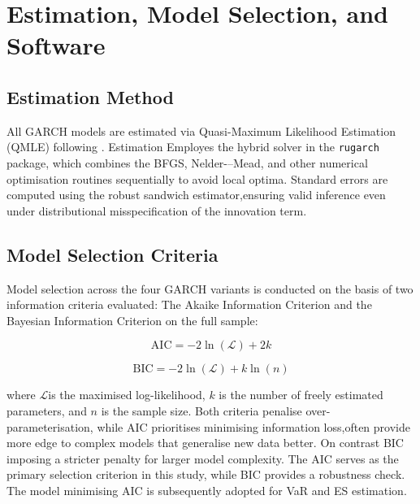 \section{Estimation, Model Selection, and Software}
\subsection{Estimation Method}

All GARCH models are estimated via Quasi-Maximum Likelihood Estimation (QMLE) following \citet{bollerslev1992quasi}. Estimation Employes the hybrid solver in the \citep{ghalanos2020introduction} \texttt{rugarch} package, which combines the BFGS,  Nelder-–Mead, and other numerical optimisation routines sequentially to avoid local optima. Standard errors are computed using the \citet{bollerslev1992quasi} robust sandwich estimator,ensuring valid inference even under distributional misspecification of the innovation term.

\subsection{Model Selection Criteria}
Model selection across the four GARCH variants is conducted on the basis of two information criteria evaluated: The Akaike Information 
Criterion \citep[AIC;][]{akaike1974} and the Bayesian 
Information Criterion \citep[BIC;][]{schwarz1978} on the full sample:

\begin{equation}
    \mathrm{AIC}
=
-2 \ln(\mathcal{L})
+
2k
\end{equation}

\begin{equation}
    \mathrm{BIC}
=
-2 \ln(\mathcal{L})
+
k \ln(n)
\end{equation}

where $\mathcal{L}$is the  maximised log-likelihood, $k$ is the number of freely estimated parameters, and $n$ is the sample size. Both criteria penalise  over-parameterisation, while AIC prioritises  minimising  information loss,often provide more edge to complex models that generalise new data better. On contrast BIC imposing a stricter penalty for larger model complexity. The AIC serves as the primary selection criterion in this study, while BIC  provides a robustness check. The model minimising AIC is subsequently adopted for VaR and ES estimation.

\vspace{2cm}

